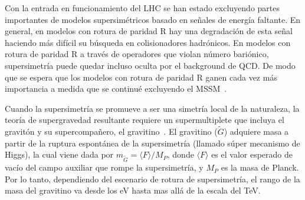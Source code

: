 Con la entrada en funcionamiento del LHC se han estado excluyendo
partes importantes de modelos supersimétricos basado en señales de
energía faltante. En general, en modelos con rotura de paridad R hay
una degradación de esta señal haciendo más difícil su búsqueda en
colisionadores hadrónicos. En modelos con rotura de paridad R a través
de operadores que violan número bariónico, supersimetría puede quedar
incluso oculta por el background de QCD. De modo que se espera que los
modelos con rotura de paridad R ganen cada vez más importancia a
medida que se continué excluyendo el MSSM~\cite{Bomark:2011fj}.

Cuando la supersimetría se promueve a ser una simetría local de la
naturaleza, la teoría de supergravedad resultante requiere un
supermultiplete que incluya el gravitón y su supercompañero, el
gravitino~\cite{Martin:1997ns,Nilles:1983ge}. El gravitino ($\tilde
G$) adquiere masa a partir de la ruptura espontánea de la
supersimetría (llamado súper mecanismo de Higgs), la cual viene dada
por $m_{\tilde G}=\langle F\rangle/M_P$, donde $\langle F\rangle$ es el valor esperado de vacío
del campo auxiliar que rompe la supersimetría, y $M_P$ es la masa de
Planck. Por lo tanto, dependiendo del escenario de rotura de
supersimetría, el rango de la masa del gravitino va desde los eV hasta
mas allá de la escala del TeV.

